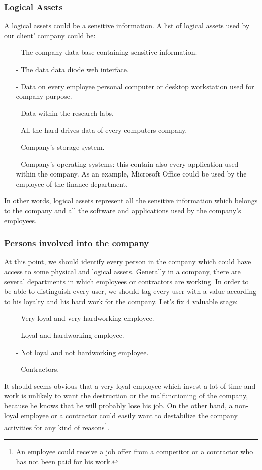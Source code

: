 \documentclass[a4paper,10pt]{article}
\begin{document}
\subsubsection{Logical Assets}
A logical assets could be a sensitive information. A list of logical assets used by our client' company could be:
\begin{enumerate}
\item[-] The company data base containing sensitive information.
\item[-] The data data diode web interface.
\item[-] Data on every employee personal computer or desktop workstation used for company purpose.
\item[-] Data within the research labs.
\item[-] All the hard drives data of every computers company. 
\item[-] Company's storage system.
\item[-] Company's operating systems: this contain also every application used within the company. As an example, Microsoft Office could be used by the employee of the finance department.
\end{enumerate}
In other words, logical assets represent all the sensitive information which belongs to the company and all the software and applications used by the company's employees.

\subsubsection{Persons involved into the company}
At this point, we should identify every person in the company which could have access to some physical and logical assets. Generally in a company, there are several departments in which employees or contractors are working. In order to be able to distinguish every user, we should tag every user with a value according to his loyalty and his hard work for the company. Let's fix 4 valuable stage:
\begin{enumerate}
\item[-] Very loyal and very hardworking employee.
\item[-] Loyal and hardworking employee.
\item[-] Not loyal and not hardworking employee.
\item[-] Contractors.
\end{enumerate}
It should seems obvious that a very loyal employee which invest a lot of time and work is unlikely to want the destruction or the malfunctioning of the company, because he knows that he will probably lose his job. On the other hand, a non-loyal employee or a contractor could easily want to destabilize the company activities for any kind of reasons\footnote{An employee could receive a job offer from a competitor or a contractor who has not been paid for his work.}.
\end{document}

